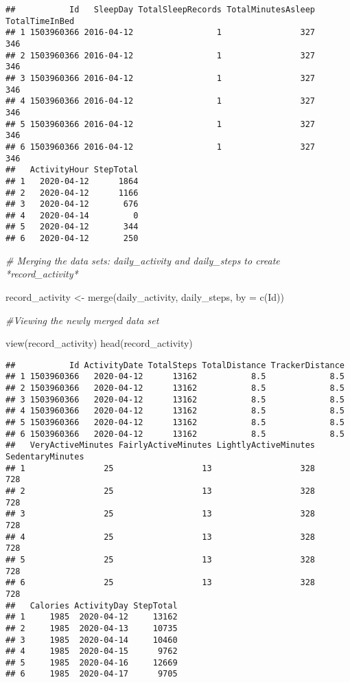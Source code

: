 \documentclass[
]{article}
\newenvironment{Shaded}{\begin{snugshade}}{\end{snugshade}}
\newcommand{\AttributeTok}[1]{\textcolor[rgb]{0.77,0.63,0.00}{#1}}
\newcommand{\CommentTok}[1]{\textcolor[rgb]{0.56,0.35,0.01}{\textit{#1}}}
\newcommand{\FunctionTok}[1]{\textcolor[rgb]{0.00,0.00,0.00}{#1}}
\newcommand{\NormalTok}[1]{#1}
\newcommand{\OtherTok}[1]{\textcolor[rgb]{0.56,0.35,0.01}{#1}}
\newcommand{\StringTok}[1]{\textcolor[rgb]{0.31,0.60,0.02}{#1}}
\begin{document}
\begin{verbatim}
##           Id   SleepDay TotalSleepRecords TotalMinutesAsleep TotalTimeInBed
## 1 1503960366 2016-04-12                 1                327            346
## 2 1503960366 2016-04-12                 1                327            346
## 3 1503960366 2016-04-12                 1                327            346
## 4 1503960366 2016-04-12                 1                327            346
## 5 1503960366 2016-04-12                 1                327            346
## 6 1503960366 2016-04-12                 1                327            346
##   ActivityHour StepTotal
## 1   2020-04-12      1864
## 2   2020-04-12      1166
## 3   2020-04-12       676
## 4   2020-04-14         0
## 5   2020-04-12       344
## 6   2020-04-12       250
\end{verbatim}

\begin{Shaded}
\begin{Highlighting}[]
\CommentTok{\# Merging the data sets: daily\_activity and daily\_steps to create *record\_activity*}

\NormalTok{record\_activity }\OtherTok{\textless{}{-}} \FunctionTok{merge}\NormalTok{(daily\_activity, daily\_steps, }\AttributeTok{by =} \FunctionTok{c}\NormalTok{(}\StringTok{\textquotesingle{}Id\textquotesingle{}}\NormalTok{))}

\CommentTok{\#Viewing the newly merged data set}

\FunctionTok{view}\NormalTok{(record\_activity)}
\FunctionTok{head}\NormalTok{(record\_activity)}
\end{Highlighting}
\end{Shaded}

\begin{verbatim}
##           Id ActivityDate TotalSteps TotalDistance TrackerDistance
## 1 1503960366   2020-04-12      13162           8.5             8.5
## 2 1503960366   2020-04-12      13162           8.5             8.5
## 3 1503960366   2020-04-12      13162           8.5             8.5
## 4 1503960366   2020-04-12      13162           8.5             8.5
## 5 1503960366   2020-04-12      13162           8.5             8.5
## 6 1503960366   2020-04-12      13162           8.5             8.5
##   VeryActiveMinutes FairlyActiveMinutes LightlyActiveMinutes SedentaryMinutes
## 1                25                  13                  328              728
## 2                25                  13                  328              728
## 3                25                  13                  328              728
## 4                25                  13                  328              728
## 5                25                  13                  328              728
## 6                25                  13                  328              728
##   Calories ActivityDay StepTotal
## 1     1985  2020-04-12     13162
## 2     1985  2020-04-13     10735
## 3     1985  2020-04-14     10460
## 4     1985  2020-04-15      9762
## 5     1985  2020-04-16     12669
## 6     1985  2020-04-17      9705
\end{verbatim}
\end{document}
